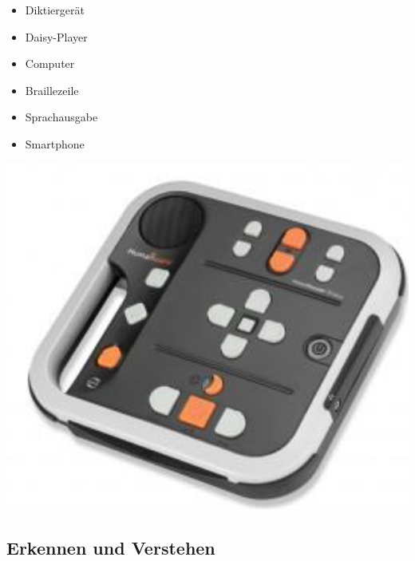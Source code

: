 \documentclass[paper=a4, fontsize=11pt]{scrartcl} %
\numberwithin{equation}{section} %
\numberwithin{figure}{section} %
\numberwithin{table}{section} %
\begin{document}
\begin{minipage}[c]{0.55\textwidth}
\begin{itemize}
\item Diktiergerät
\item Daisy-Player
\item Computer
\item Braillezeile
\item Sprachausgabe
\item Smartphone
\end{itemize}
\end{minipage}
\begin{minipage}[c]{0.35\textwidth}
\includegraphics[width=\textwidth]{imgs/daisy}
\end{minipage}

\subsection{Erkennen und Verstehen}
\end{document}
